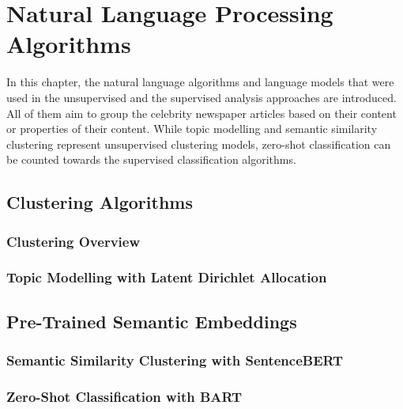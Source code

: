 \renewcommand{\imagepath}{../30-algorithms/img}

\chapter{Natural Language Processing Algorithms}\label{ch:algorithms}
In this chapter, the natural language algorithms and language models that were used in the unsupervised and the supervised analysis approaches are introduced. All of them aim to group the celebrity newspaper articles based on their content or properties of their content. While topic modelling and semantic similarity clustering represent unsupervised clustering models, zero-shot classification can be counted towards the supervised classification algorithms.


\section{Clustering Algorithms}\label{ch:clustering_algorithms}
\subsection*{Clustering Overview}\label{ch:clustering}
\subsection*{Topic Modelling with Latent Dirichlet Allocation}\label{ch:lda}


\section{Pre-Trained Semantic Embeddings}\label{ch:pretrained_algorithms}
\subsection*{Semantic Similarity Clustering with SentenceBERT}\label{ch:sentencebert}
\subsection*{Zero-Shot Classification with BART}\label{ch:zero_shot}